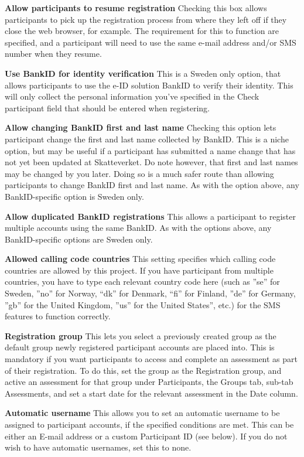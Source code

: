 \documentclass[]{book}
\begin{document}
\textbf{Allow participants to resume registration}
Checking this box allows participants to pick up the registration process from where they left off if they close the web browser, for example. The requirement for this to function are specified, and a participant will need to use the same e-mail address and/or SMS number when they resume.

\textbf{Use BankID for identity verification}
This is a Sweden only option, that allows participants to use the e-ID solution BankID to verify their identity. This will only collect the personal information you've specified in the Check participant field that should be entered when registering.

\textbf{Allow changing BankID first and last name}
Checking this option lets participant change the first and last name collected by BankID. This is a niche option, but may be useful if a participant has submitted a name change that has not yet been updated at Skatteverket. Do note however, that first and last names may be changed by you later. Doing so is a much safer route than allowing participants to change BankID first and last name. As with the option above, any BankID-specific option is Sweden only.

\textbf{Allow duplicated BankID registrations}
This allows a participant to register multiple accounts using the same BankID. As with the options above, any BankID-specific options are Sweden only.

\textbf{Allowed calling code countries}
This setting specifies which calling code countries are allowed by this project. If you have participant from multiple countries, you have to type each relevant country code here (such as ''se'' for Sweden, ''no'' for Norway, ``dk'' for Denmark, ``fi'' for Finland, ''de'' for Germany, ''gb'' for the United Kingdom, ''us'' for the United States'', etc.) for the SMS features to function correctly.

\textbf{Registration group}
This lets you select a previously created group as the default group newly registered participant accounts are placed into. This is mandatory if you want participants to access and complete an assessment as part of their registration.
To do this, set the group as the Registration group, and active an assessment for that group under Participants, the Groups tab, sub-tab Assessments, and set a start date for the relevant assessment in the Date column.

\textbf{Automatic username}
This allows you to set an automatic username to be assigned to participant accounts, if the specified conditions are met. This can be either an E-mail address or a custom Participant ID (see below). If you do not wish to have automatic usernames, set this to none.
\end{document}
